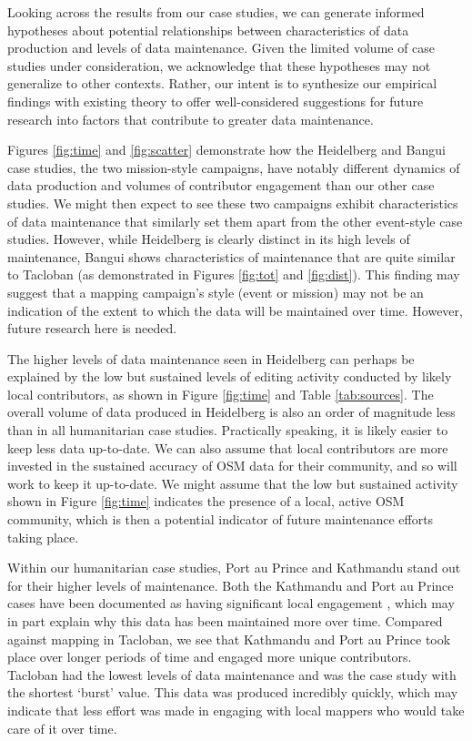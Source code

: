 Looking across the results from our case studies, we can generate informed hypotheses about potential relationships between characteristics of data production and levels of data maintenance. Given the limited volume of case studies under consideration, we acknowledge that these hypotheses may not generalize to other contexts. Rather, our intent is to synthesize our empirical findings with existing theory to offer well-considered suggestions for future research into factors that contribute to greater data maintenance. 

Figures \ref{fig:time} and \ref{fig:scatter} demonstrate how the Heidelberg and Bangui case studies, the two mission-style campaigns, have notably different dynamics of data production and volumes of contributor engagement than our other case studies. We might then expect to see these two campaigns exhibit characteristics of data maintenance that similarly set them apart from the other event-style case studies. However, while Heidelberg is clearly distinct in its high levels of maintenance, Bangui shows characteristics of maintenance that are quite similar to Tacloban (as demonstrated in Figures \ref{fig:tot} and \ref{fig:dist}). This finding may suggest that a mapping campaign’s style (event or mission) may not be an indication of the extent to which the data will be maintained over time. However, future research here is needed. 

The higher levels of data maintenance seen in Heidelberg can perhaps be explained by the low but sustained levels of editing activity conducted by likely local contributors, as shown in Figure \ref{fig:time} and Table \ref{tab:sources}. The overall volume of data produced in Heidelberg is also an order of magnitude less than in all humanitarian case studies. Practically speaking, it is likely easier to keep less data up-to-date. We can also assume that local contributors are more invested in the sustained accuracy of OSM data for their community, and so will work to keep it up-to-date. We might assume that the low but sustained activity shown in Figure \ref{fig:time} indicates the presence of a local, active OSM community, which is then a potential indicator of future maintenance efforts taking place. 

Within our humanitarian case studies, Port au Prince and Kathmandu stand out for their higher levels of maintenance. Both the Kathmandu and Port au Prince cases have been documented as having significant local engagement \parencite{soden_crowdsourced_2014}, which may in part explain why this data has been maintained more over time. Compared against mapping in Tacloban, we see that Kathmandu and Port au Prince took place over longer periods of time and engaged more unique contributors. Tacloban had the lowest levels of data maintenance and was the case study with the shortest ‘burst’ value. This data was produced incredibly quickly, which may indicate that less effort was made in engaging with local mappers who would take care of it over time. 


